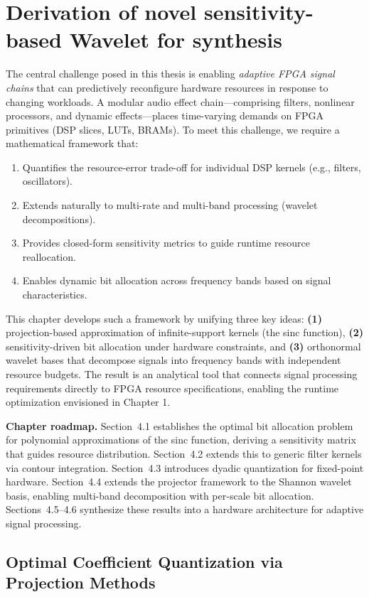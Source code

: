 \chapter{Derivation of novel sensitivity-based Wavelet for synthesis}

The central challenge posed in this thesis is enabling \emph{adaptive FPGA signal chains} that can predictively reconfigure hardware resources in response to changing workloads. A modular audio effect chain—comprising filters, nonlinear processors, and dynamic effects—places time-varying demands on FPGA primitives (DSP slices, LUTs, BRAMs). To meet this challenge, we require a mathematical framework that:
\begin{enumerate}
\item Quantifies the resource-error trade-off for individual DSP kernels (e.g., filters, oscillators).
\item Extends naturally to multi-rate and multi-band processing (wavelet decompositions).
\item Provides closed-form sensitivity metrics to guide runtime resource reallocation.
\item Enables dynamic bit allocation across frequency bands based on signal characteristics.
\end{enumerate}

This chapter develops such a framework by unifying three key ideas: \textbf{(1)} projection-based approximation of infinite-support kernels (the sinc function), \textbf{(2)} sensitivity-driven bit allocation under hardware constraints, and \textbf{(3)} orthonormal wavelet bases that decompose signals into frequency bands with independent resource budgets. The result is an analytical tool that connects signal processing requirements directly to FPGA resource specifications, enabling the runtime optimization envisioned in Chapter 1.

\bigskip
\noindent\textbf{Chapter roadmap.} Section~4.1 establishes the optimal bit allocation problem for polynomial approximations of the sinc function, deriving a sensitivity matrix that guides resource distribution. Section~4.2 extends this to generic filter kernels via contour integration. Section~4.3 introduces dyadic quantization for fixed-point hardware. Section~4.4 extends the projector framework to the Shannon wavelet basis, enabling multi-band decomposition with per-scale bit allocation. Sections~4.5--4.6 synthesize these results into a hardware architecture for adaptive signal processing.

\section{Optimal Coefficient Quantization via Projection Methods}

